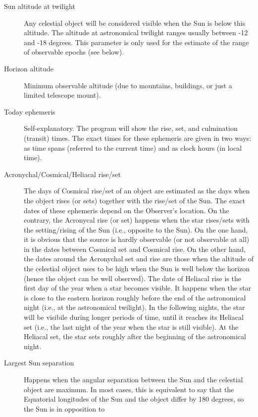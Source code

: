 \begin{description}
\item[Sun altitude at twilight] Any celestial object will be
  considered visible when the Sun is below this altitude. The altitude
  at astronomical twilight ranges usually between -12 and -18
  degrees. This parameter is only used for the estimate of the range
  of observable epochs (see below).
\item[Horizon altitude] Minimum observable altitude (due to mountains,
  buildings, or just a limited telescope mount).
\item[Today ephemeris] Self-explanatory. The program will show the
  rise, set, and culmination (transit) times. The exact times for
  these ephemeris are given in two ways: as time spans (referred to
  the current time) and as clock hours (in local time).
\item[Acronychal/Cosmical/Heliacal rise/set] The days of Cosmical
  rise/set of an object are estimated as the days when the object
  rises (or sets) together with the rise/set of the Sun. The exact
  dates of these ephemeris depend on the Observer's location. On the
  contrary, the Acronycal rise (or set) happens when the star
  rises/sets with the setting/rising of the Sun (i.e., opposite to the
  Sun). On the one hand, it is obvious that the source is hardly
  observable (or not observable at all) in the dates between Cosmical
  set and Cosmical rise. On the other hand, the dates around the
  Acronychal set and rise are those when the altitude of the celestial
  object uses to be high when the Sun is well below the horizon (hence
  the object can be well observed). The date of Heliacal rise is the
  first day of the year when a star becomes visible. It happens when
  the star is close to the eastern horizon roughly before the end of
  the astronomical night (i.e., at the astronomical twilight). In the
  following nights, the star will be visibile during longer periods of
  time, until it reaches its Heliacal set (i.e., the last night of the
  year when the star is still visible). At the Heliacal set, the star
  sets roughly after the beginning of the astronomical night.
\item[Largest Sun separation] Happens when the angular separation
  between the Sun and the celestial object are maximum. In most cases,
  this is equivalent to say that the Equatorial longitudes of the Sun
  and the object differ by 180 degrees, so the Sun is in opposition to

\end{description}
